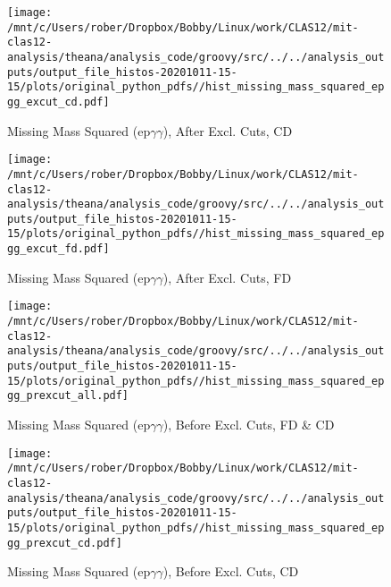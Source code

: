 \documentclass{article}
\begin{document}
\begin{landscape}
    \begin{figure}[h]
        \centering

        \texttt{[image: /mnt/c/Users/rober/Dropbox/Bobby/Linux/work/CLAS12/mit-clas12-analysis/theana/analysis\_code/groovy/src/../../analysis\_outputs/output\_file\_histos-20201011-15-15/plots/original\_python\_pdfs//hist\_missing\_mass\_squared\_epgg\_excut\_cd.pdf]}
        \captionsetup{textformat=empty,labelformat=blank}
        \caption{Missing Mass Squared (ep$\gamma$$\gamma$), After Excl. Cuts, CD}
    \end{figure}
    \clearpage
    
    \begin{figure}[h]
        \centering

        \texttt{[image: /mnt/c/Users/rober/Dropbox/Bobby/Linux/work/CLAS12/mit-clas12-analysis/theana/analysis\_code/groovy/src/../../analysis\_outputs/output\_file\_histos-20201011-15-15/plots/original\_python\_pdfs//hist\_missing\_mass\_squared\_epgg\_excut\_fd.pdf]}
        \captionsetup{textformat=empty,labelformat=blank}
        \caption{Missing Mass Squared (ep$\gamma$$\gamma$), After Excl. Cuts, FD}
    \end{figure}
    \clearpage
    
    \begin{figure}[h]
        \centering

        \texttt{[image: /mnt/c/Users/rober/Dropbox/Bobby/Linux/work/CLAS12/mit-clas12-analysis/theana/analysis\_code/groovy/src/../../analysis\_outputs/output\_file\_histos-20201011-15-15/plots/original\_python\_pdfs//hist\_missing\_mass\_squared\_epgg\_prexcut\_all.pdf]}
        \captionsetup{textformat=empty,labelformat=blank}
        \caption{Missing Mass Squared (ep$\gamma$$\gamma$), Before Excl. Cuts, FD \& CD}
    \end{figure}
    \clearpage
    
    \begin{figure}[h]
        \centering

        \texttt{[image: /mnt/c/Users/rober/Dropbox/Bobby/Linux/work/CLAS12/mit-clas12-analysis/theana/analysis\_code/groovy/src/../../analysis\_outputs/output\_file\_histos-20201011-15-15/plots/original\_python\_pdfs//hist\_missing\_mass\_squared\_epgg\_prexcut\_cd.pdf]}
        \captionsetup{textformat=empty,labelformat=blank}
        \caption{Missing Mass Squared (ep$\gamma$$\gamma$), Before Excl. Cuts, CD}
    \end{figure}
    \clearpage
    

\end{landscape}
\end{document}
